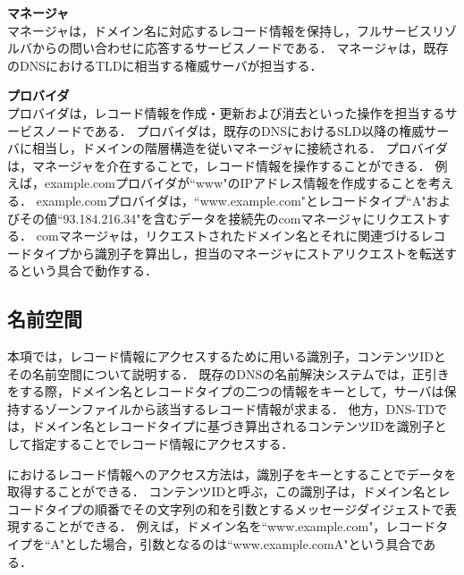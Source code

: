 \textbf{マネージャ}\\
マネージャは，ドメイン名に対応するレコード情報を保持し，フルサービスリゾルバからの問い合わせに応答するサービスノードである．
マネージャは，既存のDNSにおけるTLDに相当する権威サーバが担当する．


\textbf{プロバイダ}\\
プロバイダは，レコード情報を作成・更新および消去といった操作を担当するサービスノードである．
プロバイダは，既存のDNSにおけるSLD以降の権威サーバに相当し，ドメインの階層構造を従いマネージャに接続される．
プロバイダは，マネージャを介在することで，レコード情報を操作することができる．
例えば，example.comプロバイダが``www"のIPアドレス情報を作成することを考える．
example.comプロバイダは，``www.example.com"とレコードタイプ``A"およびその値``93.184.216.34"を含むデータを接続先のcomマネージャにリクエストする．
comマネージャは，リクエストされたドメイン名とそれに関連づけるレコードタイプから識別子を算出し，担当のマネージャにストアリクエストを転送するという具合で動作する．

\subsection{名前空間}
本項では，レコード情報にアクセスするために用いる識別子，コンテンツIDとその名前空間について説明する．
既存のDNSの名前解決システムでは，正引きをする際，ドメイン名とレコードタイプの二つの情報をキーとして，サーバは保持するゾーンファイルから該当するレコード情報が求まる．
他方，DNS-TDでは，ドメイン名とレコードタイプに基づき算出されるコンテンツIDを識別子として指定することでレコード情報にアクセスする．

におけるレコード情報へのアクセス方法は，識別子をキーとすることでデータを取得することができる．
コンテンツIDと呼ぶ，この識別子は，ドメイン名とレコードタイプの順番でその文字列の和を引数とするメッセージダイジェストで表現することができる．
例えば，ドメイン名を``www.example.com"，レコードタイプを``A"とした場合，引数となるのは``www.example.comA"という具合である．

